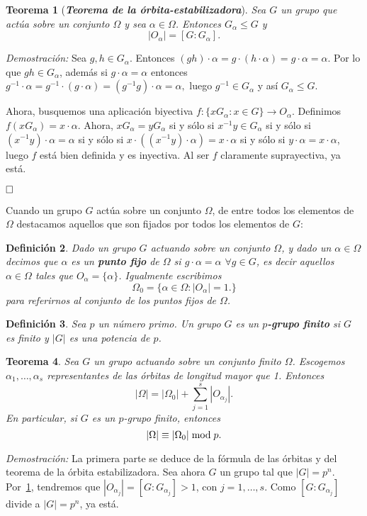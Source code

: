 \documentclass[12pt]{article}
\newtheorem{theorem}{Teorema}[section]
\newtheorem{definition}[theorem]{Definición}
\begin{document}
\begin{theorem}[\textbf{\textit{Teorema de la órbita-estabilizadora}}] \label{eq:torest}
Sea $G$ un grupo que actúa sobre un conjunto $\Omega$ y sea $\alpha \in \Omega$. Entonces $G_\alpha \leq G$ y $$|O_\alpha| = [G:G_\alpha].$$
\end{theorem}
\emph{Demostración: }Sea $g,h \in G_\alpha$. Entonces $(gh) \cdot \alpha = g \cdot (h\cdot \alpha) = g \cdot \alpha = \alpha.$ Por lo que $gh \in G_\alpha$, además si $g\cdot \alpha = \alpha$ entonces $g^{-1} \cdot \alpha = g^{-1} \cdot (g\cdot \alpha)= (g^{-1}g) \cdot \alpha = \alpha,$ luego $g^{-1} \in G_\alpha$ y así $G_\alpha \leq G$.

Ahora, busquemos una aplicación biyectiva $f \colon \lbrace xG_\alpha : x \in G \rbrace \longrightarrow O_\alpha$. Definimos $f(xG_\alpha) = x\cdot \alpha$. Ahora, $xG_\alpha = y G_\alpha$ si y sólo si $x^{-1}y \in G_\alpha$ si y sólo si $(x^{-1}y) \cdot \alpha = \alpha$ si y sólo si $x \cdot ((x^{-1}y) \cdot \alpha) = x \cdot \alpha$ si y sólo si $y \cdot \alpha = x \cdot \alpha$, luego $f$ está bien definida y es inyectiva. Al ser $f$ claramente suprayectiva, ya está.

$\hfill \square$

Cuando un grupo $G$ actúa sobre un conjunto $\Omega$, de entre todos los elementos de $\Omega$ destacamos aquellos que son fijados por todos los elementos de $G$:

\begin{definition}Dado un grupo $G$ actuando sobre un conjunto $\Omega$, y dado un $\alpha \in \Omega$ decimos que $\alpha$ es un \textbf{punto fijo} de $\Omega$ si $g \cdot \alpha = \alpha$ $\forall g \in G$, es decir aquellos $\alpha \in \Omega$ tales que $O_\alpha = \lbrace \alpha \rbrace$. Igualmente escribimos $$\Omega_0 = \lbrace \alpha \in \Omega : |O_\alpha | = 1. \rbrace$$ para referirnos al conjunto de los puntos fijos de $\Omega$.
\end{definition}

\begin{definition}Sea $p$ un número primo. Un grupo $G$ es un \textbf{$p$-grupo finito} si $G$ es finito y $|G|$ es una potencia de $p$.
\end{definition}

\begin{theorem}\label{eq:ecClasesp}
Sea $G$ un grupo actuando sobre un conjunto finito $\Omega$. Escogemos $\alpha_1, \ldots, \alpha_s$ representantes de las órbitas de longitud mayor que 1. Entonces $$|\Omega| = |\Omega_0| + \sum_{j=1}^s |O_{\alpha_j}|.$$ En particular, si $G$ es un $p$-grupo finito, entonces $$|\Omega| \equiv |\Omega_0|\hspace{0.1cm} \text{mod}\hspace{0.1cm} p.$$
\end{theorem}
\emph{Demostración: }La primera parte se deduce de la fórmula de las órbitas y del teorema de la órbita estabilizadora. Sea ahora $G$ un grupo tal que $|G| = p^n$. Por~\ref{eq:torest}, tendremos que $|O_{\alpha_j}| = [G:G_{\alpha_j}] > 1$, con $j = 1, \ldots , s$. Como $[G:G_{\alpha_j}]$ divide a $|G| = p^n$, ya está.
\end{document}
